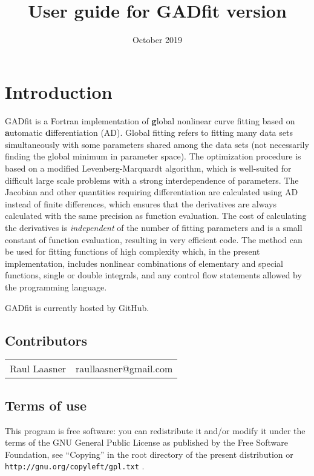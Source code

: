 \documentclass{article}
\title{User guide for GADfit version \version}
\date{October 2019}
\begin{document}
\maketitle
\tableofcontents

\section{Introduction}

GADfit is a Fortran implementation of \textbf{g}lobal nonlinear curve fitting based on \textbf{a}utomatic \textbf{d}ifferentiation (AD). Global fitting refers to fitting many data sets simultaneously with some parameters shared among the data sets (not necessarily finding the global minimum in parameter space). The optimization procedure is based on a modified Levenberg-Marquardt algorithm, which is well-suited for difficult large scale problems with a strong interdependence of parameters. The Jacobian and other quantities requiring differentiation are calculated using AD instead of finite differences, which ensures that the derivatives are always calculated with the same precision as function evaluation. The cost of calculating the derivatives is \textit{independent} of the number of fitting parameters and is a small constant of function evaluation, resulting in very efficient code. The method can be used for fitting functions of high complexity which, in the present implementation, includes nonlinear combinations of elementary and special functions, single or double integrals, and any control flow statements allowed by the programming language.

GADfit is currently hosted by GitHub.

\subsection{Contributors}

\begin{tabular}{ll}
  Raul Laasner & raullaasner@gmail.com \\
\end{tabular}

\subsection{Terms of use}

This program is free software: you can redistribute it and/or modify it under the terms of the GNU General Public License as published by the Free Software Foundation, see ``Copying'' in the root directory of the present distribution or \texttt{http://gnu.org/copyleft/gpl.txt} .
\end{document}
